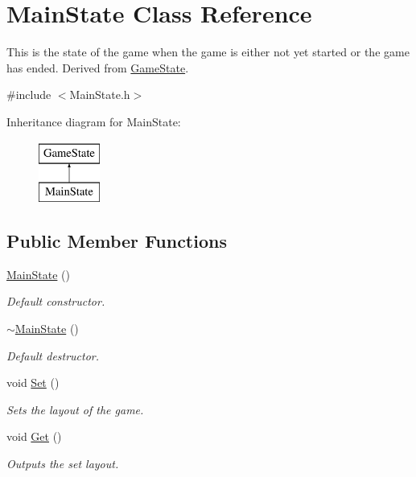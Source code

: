 \hypertarget{classMainState}{\section{Main\-State Class Reference}
\label{classMainState}
}


This is the state of the game when the game is either not yet started or the game has ended. Derived from \hyperlink{classGameState}{Game\-State}.  




{\ttfamily \#include $<$Main\-State.\-h$>$}

Inheritance diagram for Main\-State\-:\begin{figure}[H]
\begin{center}
\leavevmode
\includegraphics[height=2.000000cm]{classMainState}
\end{center}
\end{figure}
\subsection*{Public Member Functions}
\begin{DoxyCompactItemize}
\item 
\hyperlink{classMainState_afc29557ba046813d1bff4aea2501b7f1}{Main\-State} ()
\begin{DoxyCompactList}\small\item\em Default constructor. \end{DoxyCompactList}\item 
\hyperlink{classMainState_a81d631457b9c7777d09aff85a368acd9}{$\sim$\-Main\-State} ()
\begin{DoxyCompactList}\small\item\em Default destructor. \end{DoxyCompactList}\item 
void \hyperlink{classMainState_ac01eced9d617c8c8f5382a9aa96adb45}{Set} ()
\begin{DoxyCompactList}\small\item\em Sets the layout of the game. \end{DoxyCompactList}\item 
void \hyperlink{classMainState_a23233e859905d025cfc031a12977a844}{Get} ()
\begin{DoxyCompactList}\small\item\em Outputs the set layout. \end{DoxyCompactList}\end{DoxyCompactItemize}

